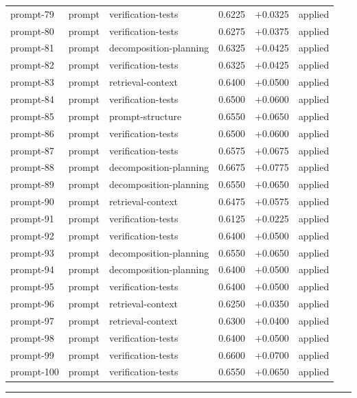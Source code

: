 \begin{center}
\begin{longtable}{llp{5.2cm}rrl}
prompt-79 & prompt & verification-tests & 0.6225 & +0.0325 & applied \\
prompt-80 & prompt & verification-tests & 0.6275 & +0.0375 & applied \\
prompt-81 & prompt & decomposition-planning & 0.6325 & +0.0425 & applied \\
prompt-82 & prompt & verification-tests & 0.6325 & +0.0425 & applied \\
prompt-83 & prompt & retrieval-context & 0.6400 & +0.0500 & applied \\
prompt-84 & prompt & verification-tests & 0.6500 & +0.0600 & applied \\
prompt-85 & prompt & prompt-structure & 0.6550 & +0.0650 & applied \\
prompt-86 & prompt & verification-tests & 0.6500 & +0.0600 & applied \\
prompt-87 & prompt & verification-tests & 0.6575 & +0.0675 & applied \\
prompt-88 & prompt & decomposition-planning & 0.6675 & +0.0775 & applied \\
prompt-89 & prompt & decomposition-planning & 0.6550 & +0.0650 & applied \\
prompt-90 & prompt & retrieval-context & 0.6475 & +0.0575 & applied \\
prompt-91 & prompt & verification-tests & 0.6125 & +0.0225 & applied \\
prompt-92 & prompt & verification-tests & 0.6400 & +0.0500 & applied \\
prompt-93 & prompt & decomposition-planning & 0.6550 & +0.0650 & applied \\
prompt-94 & prompt & decomposition-planning & 0.6400 & +0.0500 & applied \\
prompt-95 & prompt & verification-tests & 0.6400 & +0.0500 & applied \\
prompt-96 & prompt & retrieval-context & 0.6250 & +0.0350 & applied \\
prompt-97 & prompt & retrieval-context & 0.6300 & +0.0400 & applied \\
prompt-98 & prompt & verification-tests & 0.6400 & +0.0500 & applied \\
prompt-99 & prompt & verification-tests & 0.6600 & +0.0700 & applied \\
prompt-100 & prompt & verification-tests & 0.6550 & +0.0650 & applied \\
\bottomrule\end{longtable}\end{center}
\par\bigskip\hrule\bigskip
